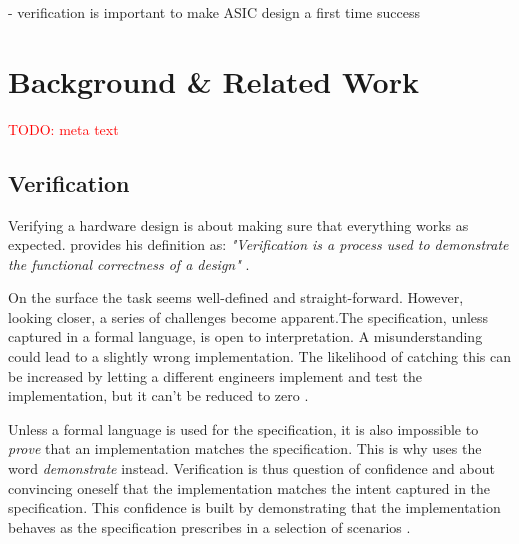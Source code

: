 \documentclass[11pt]{report}
\newcommand{\todo}[1]{\textcolor{red}{TODO: #1}}
\begin{document}
- verification is important to make ASIC design a first time success \cite[Ch. 3]{bergeron2012writing}

\chapter{Background \& Related Work} %

\todo{meta text}

\begin{comment}
- what is the purpose of verification
- what tools do we have to ease verification
- what tools do we have to measure verification progress
- don't introduce "things" but introduce the problems/challenges they're trying to solve

- in this section a complete picture of what verification includes should be drawn in order to put the foundation for
understanding what a verification framework should provide

- to understand current state of verification, we need to look at general approaches, the langauges and their
features, frameworks, as well as methodologies
\end{comment}

\section{Verification} %

Verifying a hardware design is about making sure that everything works as expected. \citeauthor{bergeron2012writing}
provides his definition as: \textit{"Verification is a process used to demonstrate the functional correctness of a
design"} \cite[Ch. 1]{bergeron2012writing}.

On the surface the task seems well-defined and straight-forward. However, looking closer, a series of challenges
become apparent.The specification, unless captured in a formal language, is open to interpretation. A
misunderstanding could lead to a slightly wrong implementation. The likelihood of catching this can be increased by
letting a different engineers implement and test the implementation, but it can't be reduced to zero \cite[Ch.
1]{bergeron2012writing}.

Unless a formal language is used for the specification, it is also impossible to \textit{prove} that an
implementation matches the specification. This is why \citeauthor{bergeron2012writing} uses the word
\textit{demonstrate} instead. Verification is thus question of confidence and about convincing oneself that the
implementation matches the intent captured in the specification. This confidence is built by demonstrating that the
implementation behaves as the specification prescribes in a selection of scenarios \cite[Ch. 1]{bergeron2012writing}.
\end{document}
